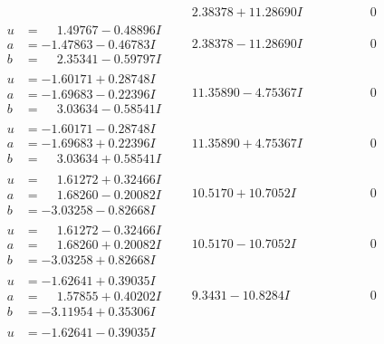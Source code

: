 \documentclass[1p]{elsarticle_modified}
\theoremstyle{definition}
\begin{document}
$$\begin{array}{c|c|c}
 & \phantom{-}2.38378 + 11.28690 I & \phantom{-0.000000 } 0 \\ \hline\begin{aligned}
u &= \phantom{-}1.49767 - 0.48896 I \\
a &= -1.47863 - 0.46783 I \\
b &= \phantom{-}2.35341 - 0.59797 I\end{aligned}
 & \phantom{-}2.38378 - 11.28690 I & \phantom{-0.000000 } 0 \\ \hline\begin{aligned}
u &= -1.60171 + 0.28748 I \\
a &= -1.69683 - 0.22396 I \\
b &= \phantom{-}3.03634 - 0.58541 I\end{aligned}
 & \phantom{-}11.35890 - 4.75367 I & \phantom{-0.000000 } 0 \\ \hline\begin{aligned}
u &= -1.60171 - 0.28748 I \\
a &= -1.69683 + 0.22396 I \\
b &= \phantom{-}3.03634 + 0.58541 I\end{aligned}
 & \phantom{-}11.35890 + 4.75367 I & \phantom{-0.000000 } 0 \\ \hline\begin{aligned}
u &= \phantom{-}1.61272 + 0.32466 I \\
a &= \phantom{-}1.68260 - 0.20082 I \\
b &= -3.03258 - 0.82668 I\end{aligned}
 & \phantom{-}10.5170 + 10.7052 I & \phantom{-0.000000 } 0 \\ \hline\begin{aligned}
u &= \phantom{-}1.61272 - 0.32466 I \\
a &= \phantom{-}1.68260 + 0.20082 I \\
b &= -3.03258 + 0.82668 I\end{aligned}
 & \phantom{-}10.5170 - 10.7052 I & \phantom{-0.000000 } 0 \\ \hline\begin{aligned}
u &= -1.62641 + 0.39035 I \\
a &= \phantom{-}1.57855 + 0.40202 I \\
b &= -3.11954 + 0.35306 I\end{aligned}
 & \phantom{-}9.3431 - 10.8284 I & \phantom{-0.000000 } 0 \\ \hline\begin{aligned}
u &= -1.62641 - 0.39035 I \\

\end{aligned}
\end{array}$$
\end{document}
